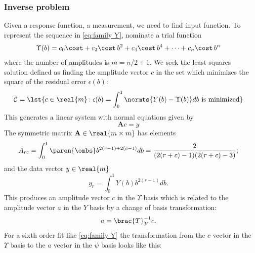 \documentclass[final,leqno,onefignum,onetabnum]{siamltex1213}
\begin{document}

\subsubsection{Inverse problem}
Given a response function, a measurement, we need to find input function. To represent the sequence in \eqref{eq:family Y}, nominate a trial function
  \begin{equation}
    \Upsilon (b) = c_{0} \cost + c_{2} \cost \,b^{2} + c_{4} \cost \,b^{4} + \cdots + c_{n} \cost \,b^{n}
    \label{eq:upsilon}
  \end{equation}
where the number of amplitudes is $m=n/2+1$. We seek the least squares solution defined as finding the amplitude vector $c$ in the set which minimizes the square of the residual error $\epsilon(b)$:
  \begin{equation}
    \mathcal{C} = \lst{c\in\real{m} \colon \epsilon (b) = \int_{0}^{1} \normts{Y(b) - \Upsilon(b)} db\text{ is minimized}}
  \end{equation}
This generates a linear system with normal equations given by
  \begin{equation}
    \mathbf{A} c = y
    \label{eq:acey}
  \end{equation}
The symmetric matrix $\mathbf{A}\in\real{m\times m}$ has elements
  \begin{equation}
    A_{rc} = \int_{0}^{1} \paren{\ombs}b^{2(r-1)+2(c-1)}db = \frac{2}{(2(r + c)-1) (2(r + c)-3)} ;
    \label{eq:system matrix}
  \end{equation}
and the data vector $y\in\real{m}$ 
  \begin{equation}
    y_{r} = \int_{0}^{1} Y(b) b^{2(r-1)} db.
    \label{eq:data vector}
  \end{equation}
This produces an amplitude vector $c$ in the $\Upsilon$ basis which is related to the amplitude vector $a$ in the $Y$ basis by a change of basis transformation:
\begin{equation}
  a = \brac{T}_{\mathcal{Y}}^{-1}c.
\end{equation}
 For a sixth order fit like \eqref{eq:family Y} the transformation from the $c$ vector in the $\Upsilon$ basis to the $a$ vector in the $\psi$ basis looks like this:
\end{document}
